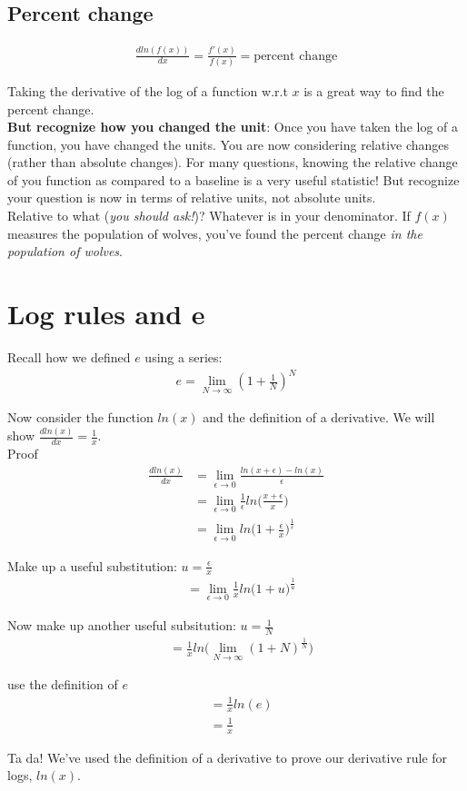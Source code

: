 \documentclass{article}
\begin{document}
\subsection{Percent change}

\begin{align}
    \frac{d ln(f(x))}{dx} = \frac{f'(x)}{f(x)} = \text{percent change}
\end{align}

Taking the derivative of the log of a function w.r.t $x$ is a great way to find the percent change. \\

\textbf{But recognize how you changed the unit}: Once you have taken the log of a function, you have changed the units. You are now considering relative changes (rather than absolute changes). For many questions, knowing the relative change of you function as compared to a baseline is a very useful statistic! But recognize your question is now in terms of relative units, not absolute units. \\

Relative to what (\textit{you should ask!})? Whatever is in your denominator. If $f(x)$ measures the population of wolves, you've found the percent change \textit{in the population of wolves}.

\section{Log rules and e}
Recall how we defined $e$ using a series:
\begin{align}
    e = \lim_{N \to \infty} (1 + \frac{1}{N})^N
\end{align}

Now consider the function $ln(x)$ and the definition of a derivative. We will show $\frac{d ln(x)}{dx} = \frac{1}{x}$.\\

Proof
\begin{align}
    \frac{dln(x)}{dx} &= \lim_{\epsilon \to 0} \frac{ln(x+\epsilon) - ln(x)}{\epsilon} \\
    &= \lim_{\epsilon \to 0} \frac{1}{\epsilon} ln\Bigg(\frac{x+\epsilon}{x} \Bigg) \\
    &= \lim_{\epsilon \to 0}  ln\Bigg(1+ \frac{\epsilon}{x} \Bigg)^{\frac{1}{\epsilon}}
\end{align}

Make up a useful substitution: $u = \frac{\epsilon}{x}$
\begin{align}
    &= \lim_{\epsilon \to 0} \frac{1}{x} ln\Bigg(1+ u \Bigg)^{\frac{1}{u}}
\end{align}

Now make up another useful subsitution: $u = \frac{1}{N}$
\begin{align}
    &= \frac{1}{x} ln\Bigg(\lim_{N \to \infty}  (1+ N)^{\frac{1}{N}}\Bigg)
\end{align}

use the definition of $e$ 
\begin{align}
    &= \frac{1}{x} ln(e)\\
    &= \frac{1}{x}
\end{align}

Ta da! We've used the definition of a derivative to prove our derivative rule for logs, $ln(x)$. 
\end{document}
